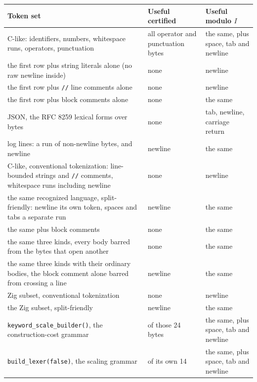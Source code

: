 \documentclass[11pt,a4paper]{article}
\theoremstyle{definition}
\theoremstyle{plain}
\newcommand{\code}[1]{\texttt{#1}}
\begin{document}
\begin{table}[!t] \centering
\begin{tabular}{>{\raggedright\arraybackslash}p{7.0cm}>{\raggedright\arraybackslash}p{3.6cm}
    >{\raggedright\arraybackslash}p{3.6cm}}
\toprule
Token set & Useful certified & Useful modulo $I$ \\
\midrule
C-like: identifiers, numbers, whitespace runs, operators, punctuation & all operator and punctuation bytes & the same,
    plus space, tab and newline \\
\addlinespace
the first row plus string literals alone (no raw newline inside) & none & newline \\
\addlinespace
the first row plus \code{//} line comments alone & none & newline \\
\addlinespace
the first row plus block comments alone & none & the same \\
\addlinespace
JSON, the RFC 8259 lexical forms over bytes & none & tab, newline, carriage return \\
\addlinespace
log lines: a run of non-newline bytes, and newline & newline & the same \\
\addlinespace
C-like, conventional tokenization: line-bounded strings and \code{//} comments, whitespace runs including newline & none
    & newline \\
\addlinespace
the same recognized language, split-friendly: newline its own token, spaces and tabs a separate run & newline & the same
    \\
\addlinespace
the same plus block comments & none & the same \\
\addlinespace
the same three kinds, every body barred from the bytes that open another & none & the same \\
\addlinespace
the same three kinds with their ordinary bodies, the block comment alone barred from crossing a line & newline & the
    same \\
\addlinespace
Zig subset, conventional tokenization & none & newline \\
\addlinespace
the Zig subset, split-friendly & newline & the same \\
\addlinespace
\code{keyword\_scale\_builder()}, the construction-cost grammar & 16 of those 24 bytes & the same, plus space, tab and
    newline \\
\addlinespace
\code{build\_lexer(false)}, the scaling grammar & 13 of its own 14 & the same, plus space, tab and newline \\
\bottomrule
\end{tabular}

\end{table}
\end{document}

